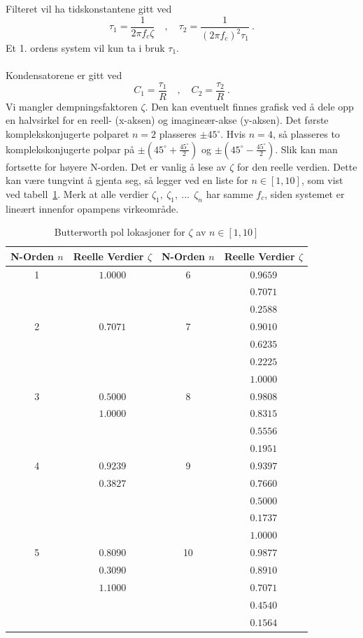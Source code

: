 \documentclass[a4paper,11pt,norsk]{article}
\begin{document}
\newpage
Filteret vil ha tidskonstantene gitt ved
\begin{equation}\label{eq: tidskonstant}
    \tau_1 = \frac{1}{2\pi f_c \zeta} \quad , \quad \tau_2 = \frac{1}{(2\pi f_c)^2 \tau_1} \: .
\end{equation}
Et 1. ordens system vil kun ta i bruk $\tau_1$. \\\\
Kondensatorene er gitt ved 
\begin{equation} \label{eq: kondensator}
    C_1 = \frac{\tau_1}{R} \quad , \quad C_2 = \frac{\tau_2}{R} \: .
\end{equation}
Vi mangler dempningsfaktoren $\zeta$. Den kan eventuelt finnes grafisk ved å dele opp en  halvsirkel for en reell- (x-aksen) og imagineær-akse (y-aksen). Det første komplekskonjugerte polparet $n = 2$ plasseres $\pm 45^{\circ}$. Hvis $n = 4$, så plasseres to komplekskonjugerte polpar på $\pm \left(45^{\circ} + \frac{45^{\circ}}{2}\right)$ og $\pm\left(45^{\circ} - \frac{45^{\circ}}{2}\right)$. Slik kan man fortsette for høyere N-orden. Det er vanlig å lese av $\zeta$ for den reelle verdien. Dette kan være tungvint å gjenta seg, så legger ved en liste for $n\in[1, 10]$, som vist ved tabell~\ref{table: N-orden}. Merk at alle verdier $\zeta_{1},\: \zeta_{1},\:... \:\: \zeta_{n}$ har samme $f_c$, siden systemet er lineært innenfor opampens virkeområde. 
\newpage
\begin{table}[htbp]
\centering
\begin{tabular}{ |c|c|c|c| } 
\hline
\textbf{N-Orden $n$} & \textbf{Reelle Verdier $\zeta$} & \textbf{N-Orden $n$} & \textbf{Reelle Verdier $\zeta$} \\
\hline
1 & $1.0000$ & 6 & $0.9659$ \\
&&& $0.7071$ \\
&&& $0.2588$
\\
\hline
2 & $0.7071$ & 7 & $0.9010$ \\
&&& $0.6235$ \\
&&& $0.2225$ \\
&&& $1.0000$
\\
\hline
3 & $0.5000$ & 8 & $0.9808$ \\
& $1.0000$ && $0.8315$ \\
&&& $0.5556$ \\
&&& $0.1951$
\\
\hline
4 & $0.9239$ & 9 & $0.9397$ \\
&$0.3827$& & $0.7660$ \\
& & & $0.5000$ \\
&&&$0.1737$ \\
&&&$1.0000$
\\
\hline
5 & $0.8090$ & 10 & $0.9877$ \\
& $0.3090$ & & $0.8910$\\
& $1.1000$ & & $0.7071$\\
& & & $0.4540$\\
& & & $0.1564$
\\
\hline
\end{tabular}
\caption{Butterworth pol lokasjoner for $\zeta$ av $n\in[1, 10]$}
\label{table: N-orden}
\end{table}
\end{document}
